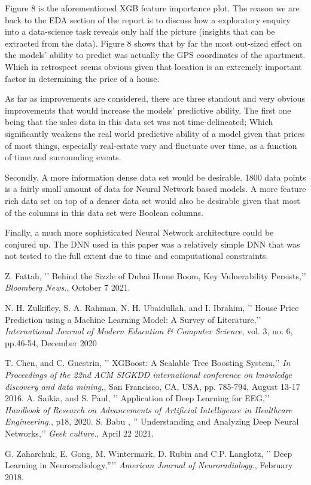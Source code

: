 \documentclass[conference]{IEEEtran}
\begin{document}
Figure 8 is the aforementioned XGB feature importance plot. The reason we are back to the EDA section of the report is to discuss how a exploratory enquiry into a data-science task reveals only half the picture (insights that can be extracted from the data). Figure 8 shows that by far the most out-sized effect on the models' ability to predict was actually the GPS coordinates of the apartment. Which in retrospect seems obvious given that location is an extremely important factor in determining the price of a house. 

As far as improvements are considered, there are three standout and very obvious improvements that would increase the models' predictive ability. The first one being that the sales data in this data set was not time-delineated; Which significantly weakens the real world predictive ability of a model given that prices of most things, especially real-estate vary and fluctuate over time, as a function of time and surrounding events. 

Secondly, A more information dense data set would be desirable. 1800 data points is a fairly small amount of data for Neural Network based models. A more feature rich data set on top of a denser data set would also be desirable given that most of the columns in this data set were Boolean columns.

Finally, a much more sophisticated Neural Network architecture could be conjured up. The DNN used in this paper was a relatively simple DNN that was not tested to the full extent due to time and computational constraints. 



\begin{thebibliography}{1}

Z. Fattah, ’’ Behind the Sizzle of Dubai Home Boom, Key Vulnerability Persists,’’ \emph { Bloomberg News.}, October 7 2021.

N. H. Zulkifley, S. A. Rahman, N. H. Ubaidullah, and I. Ibrahim, ’’ House Price Prediction using a Machine Learning Model: A Survey of Literature,’’ \emph { International Journal of Modern Education \& Computer Science}, vol. 3, no. 6, pp.46-54, December 2020

T. Chen, and C. Guestrin, ’’ XGBoost: A Scalable Tree Boosting System,’’ \emph { In Proceedings of the 22nd ACM SIGKDD international conference on knowledge discovery and data mining,}, San Francisco, CA, USA, pp. 785-794, August 13-17 2016.
A. Saikia, and S. Paul, ’’ Application of Deep Learning for EEG,’’ \emph { Handbook of Research on Advancements of Artificial Intelligence in Healthcare Engineering.}, p18, 2020.
S. Babu , ’’ Understanding and Analyzing Deep Neural Networks,’’ \emph { Geek culture.}, April 22 2021.

G. Zaharchuk, E. Gong, M. Wintermark, D. Rubin and C.P. Langlotz, ’’ Deep Learning in Neuroradiology,”’’ \emph { American Journal of Neuroradiology.}, February 2018.



\end{thebibliography}
\end{document}
